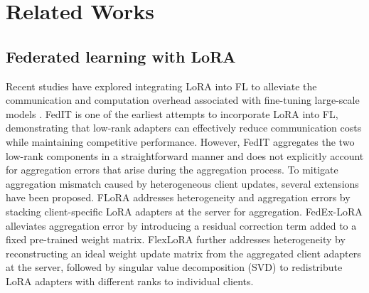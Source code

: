 \clearpage
\appendix




\section{Related Works}
\label{sec:Appendix A}

\subsection{Federated learning with LoRA}
Recent studies have explored integrating LoRA into FL to alleviate the communication and computation overhead associated with fine-tuning large-scale models \cite{kuo2024federated, cho2024heterogeneous, fang2024automated, yi2023pfedlora}. 
FedIT \cite{zhang2024towards} is one of the earliest attempts to incorporate LoRA into FL, demonstrating that low-rank adapters can effectively reduce communication costs while maintaining competitive performance.
However, FedIT aggregates the two low-rank components in a straightforward manner and does not explicitly account for aggregation errors that arise during the aggregation process. 
To mitigate aggregation mismatch caused by heterogeneous client updates, several extensions have been proposed.
FLoRA \cite{wang2024flora} addresses heterogeneity and aggregation errors by stacking client-specific LoRA adapters at the server for aggregation.
FedEx-LoRA \cite{singhal2024fedex} alleviates aggregation error by introducing a residual correction term added to a fixed pre-trained weight matrix.
FlexLoRA \cite{bai2024federated} further addresses heterogeneity by reconstructing an ideal weight update matrix from the aggregated client adapters at the server, followed by singular value decomposition (SVD) to redistribute LoRA adapters with different ranks to individual clients.

